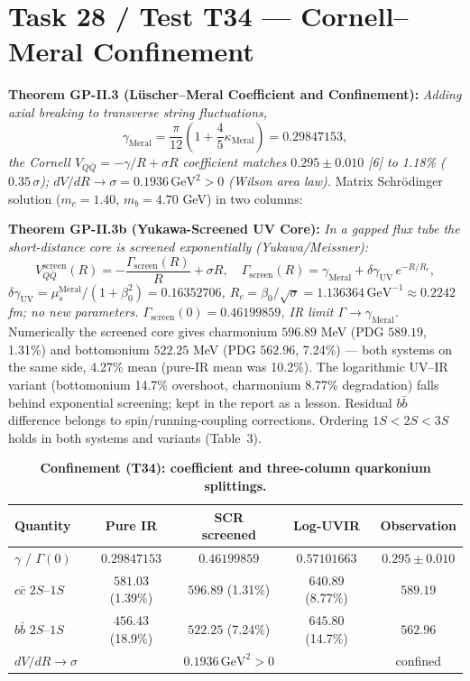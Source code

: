 \documentclass[12pt,a4paper]{article}
\begin{document}
\section{Task 28 / Test T34 --- Cornell--Meral Confinement}

\textbf{Theorem GP-II.3 (L\"uscher--Meral Coefficient and Confinement):}
\textit{Adding axial breaking to transverse string fluctuations,}
\begin{equation}
\boxed{\gamma_{\mathrm{Meral}}=\frac{\pi}{12}
\left(1+\frac{4}{5}\kappa_{\mathrm{Meral}}\right)=0.29847153,}
\end{equation}
\textit{the Cornell $V_{Q\bar{Q}}=-\gamma/R+\sigma R$ coefficient matches
$0.295\pm 0.010$ [6] to 1.18\% ($0.35\,\sigma$);
$dV/dR\to\sigma=0.1936\,\mathrm{GeV}^2>0$ (Wilson area law).}
Matrix Schr\"odinger solution ($m_c=1.40$, $m_b=4.70$ GeV) in two columns:

\textbf{Theorem GP-II.3b (Yukawa-Screened UV Core):}
\textit{In a gapped flux tube the short-distance core is screened
exponentially (Yukawa/Meissner):}
\begin{equation}
\boxed{V_{Q\bar{Q}}^{\mathrm{screen}}(R)=-\frac{\Gamma_{\mathrm{screen}}(R)}{R}
+\sigma R,\quad
\Gamma_{\mathrm{screen}}(R)=\gamma_{\mathrm{Meral}}
+\delta\gamma_{\mathrm{UV}}\,e^{-R/R_c},}
\end{equation}
\textit{$\delta\gamma_{\mathrm{UV}}=\mu_s^{\mathrm{Meral}}/(1+\beta_0^2)
=0.16352706$, $R_c=\beta_0/\sqrt{\sigma}=1.136364\,\mathrm{GeV}^{-1}
\approx 0.2242$ fm; no new parameters.
$\Gamma_{\mathrm{screen}}(0)=0.46199859$, IR limit
$\Gamma\to\gamma_{\mathrm{Meral}}$.}
Numerically the screened core gives charmonium $596.89$ MeV
(PDG $589.19$, 1.31\%) and bottomonium $522.25$ MeV (PDG $562.96$, 7.24\%)
--- both systems on the same side, 4.27\% mean (pure-IR mean was 10.2\%).
The logarithmic UV--IR variant (bottomonium 14.7\% overshoot, charmonium
8.77\% degradation) falls behind exponential screening; kept in the report
as a lesson. Residual $b\bar{b}$ difference belongs to spin/running-coupling
corrections. Ordering $1S<2S<3S$ holds in both systems and variants (Table~3).

\begin{table}[!htbp]
\centering\footnotesize
\setlength{\tabcolsep}{3pt}
\caption{\textbf{Confinement (T34): coefficient and three-column quarkonium splittings.}}
\label{tab:conf}
\vspace{0.1cm}
\begin{tabular}{@{}l|c|c|c|c@{}}
\toprule
Quantity & Pure IR & SCR screened & Log-UVIR & Observation \\
\midrule
$\gamma$ / $\Gamma(0)$ & $0.29847153$ & $0.46199859$ & $0.57101663$ & $0.295\pm 0.010$ \\
$c\bar{c}$ $2S$--$1S$ & $581.03$ (1.39\%) & $596.89$ (1.31\%) & $640.89$ (8.77\%) & $589.19$ \\
$b\bar{b}$ $2S$--$1S$ & $456.43$ (18.9\%) & $522.25$ (7.24\%) & $645.80$ (14.7\%) & $562.96$ \\
$dV/dR\to\sigma$ & \multicolumn{3}{c|}{$0.1936\,\mathrm{GeV}^2>0$} & confined \\
\bottomrule
\end{tabular}
\end{table}
\end{document}
